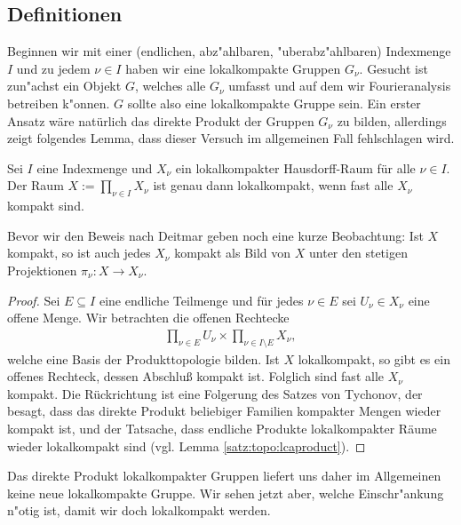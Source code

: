 \subsection{Definitionen}\label{kapitel:RDP}
		Beginnen wir mit einer (endlichen, abz"ahlbaren, "uberabz"ahlbaren) Indexmenge $I$ und zu jedem $\nu\in I$ haben wir eine lokalkompakte Gruppen $G_\nu$.
		Gesucht ist zun"achst ein Objekt $G$, welches alle $G_\nu$ umfasst und auf dem wir Fourieranalysis betreiben k"onnen.
		$G$ sollte also eine lokalkompakte Gruppe sein.
		Ein erster Ansatz wäre natürlich das direkte Produkt der Gruppen $G_\nu$ zu bilden, allerdings zeigt folgendes Lemma, dass dieser Versuch im allgemeinen Fall fehlschlagen wird.
		\begin{lemma}\label{Lemma:lokalkompaktProd}
			Sei $I$ eine Indexmenge und $X_\nu$ ein lokalkompakter Hausdorff-Raum für alle $\nu \in I$. Der Raum $X:=\prod_{\nu \in I} X_\nu$ ist genau dann lokalkompakt, wenn fast alle $X_\nu$ kompakt sind.
		\end{lemma}
		Bevor wir den Beweis nach Deitmar \cite{deitmar2010} geben noch eine kurze Beobachtung: Ist $X$ kompakt, so ist auch jedes $X_\nu$ kompakt als Bild von $X$ unter den stetigen Projektionen $\pi_\nu:X \to X_\nu$.
		\begin{proof}
			Sei $E \subseteq I$ eine endliche Teilmenge und für jedes $\nu\in E$ sei $U_\nu \in X_\nu$ eine offene Menge. Wir betrachten die offenen Rechtecke
			\begin{align*}
				\prod_{\nu\in E} U_\nu \times \prod_{\nu\in I\setminus E} X_\nu,
			\end{align*}
			welche eine Basis der Produkttopologie bilden. 
			Ist $X$ lokalkompakt, so gibt es ein offenes Rechteck, dessen Abschluß kompakt ist. 
			Folglich sind fast alle $X_\nu$ kompakt. 
			Die Rückrichtung ist eine Folgerung des Satzes von Tychonov, der besagt, dass das direkte Produkt beliebiger Familien kompakter Mengen wieder kompakt ist, und der Tatsache, dass endliche Produkte lokalkompakter Räume wieder lokalkompakt sind (vgl. Lemma \ref{satz:topo:lcaproduct}).
		\end{proof}
		Das direkte Produkt lokalkompakter Gruppen liefert uns daher im Allgemeinen keine neue lokalkompakte Gruppe. 
		Wir sehen jetzt aber, welche Einschr"ankung n"otig ist, damit wir doch lokalkompakt werden.

